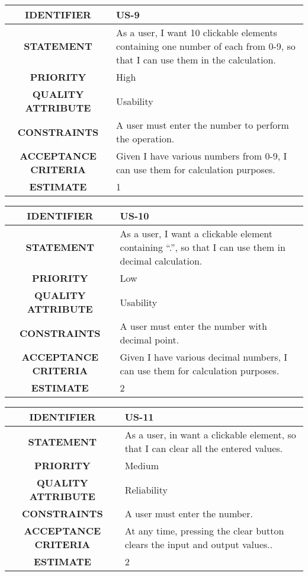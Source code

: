 \documentclass[12pt, a4paper]{article}
\begin{document}
\vspace*{2 cm}

\begin{tabular}{|c|p{10cm}|}
    \hline
    \textbf{IDENTIFIER}     & US-9 \\
    \hline
    \textbf{STATEMENT} & As a user, I want 10 clickable elements containing one number of each from 0-9, so that I can use them in the calculation.\\
    \hline
    \textbf{PRIORITY}     & High \\
    \hline
    \textbf{QUALITY ATTRIBUTE}     & Usability \\
    \hline
    \textbf{CONSTRAINTS}     & A user must enter the number to perform the operation.\\
    \hline
    \textbf{ACCEPTANCE CRITERIA} &   Given I have various numbers from 0-9, I can use them for calculation purposes.\\
    \hline
    \textbf{ESTIMATE}     & 1 \\
    \hline 
\end{tabular}

\newpage
\vspace*{0.8 cm}

\begin{tabular}{|c|p{10cm}|}
    \hline
    \textbf{IDENTIFIER}     & US-10 \\
    \hline
    \textbf{STATEMENT} & As a user, I want a clickable element containing “.”, so that I can use them in decimal calculation.\\
    \hline
    \textbf{PRIORITY}     & Low \\
    \hline
    \textbf{QUALITY ATTRIBUTE}     & Usability \\
    \hline
    \textbf{CONSTRAINTS}     & A user must enter the number with decimal point.\\
    \hline
    \textbf{ACCEPTANCE CRITERIA} &   Given I have various decimal numbers, I can use them for calculation purposes.\\
    \hline
    \textbf{ESTIMATE}     & 2 \\
    \hline 
\end{tabular}

\vspace*{2 cm}

\begin{tabular}{|c|p{10cm}|}
    \hline
    \textbf{IDENTIFIER}     & US-11 \\
    \hline
    \textbf{STATEMENT} & As a user, in want a clickable element, so that I can clear all the entered values.\\
    \hline
    \textbf{PRIORITY}     & Medium \\
    \hline
    \textbf{QUALITY ATTRIBUTE}     & Reliability \\
    \hline
    \textbf{CONSTRAINTS}     & A user must enter the number.\\
    \hline
    \textbf{ACCEPTANCE CRITERIA} &   At any time, pressing the clear button clears the input and output values..\\
    \hline
    \textbf{ESTIMATE}     & 2 \\
    \hline 
\end{tabular}
\end{document}

